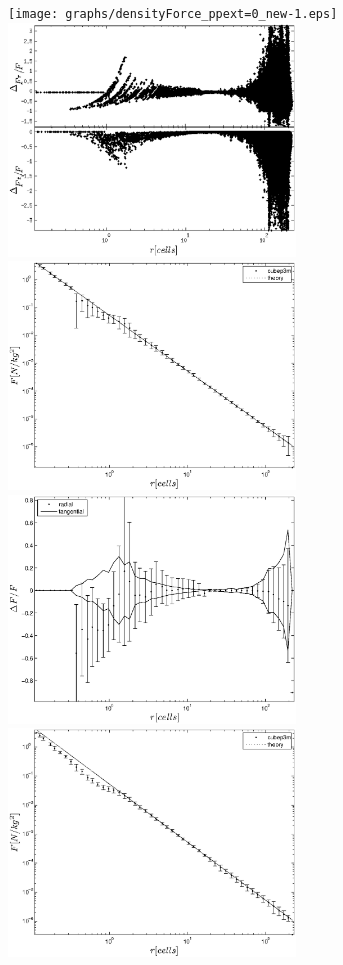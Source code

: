 \documentclass[useAMS,usenatbib]{mn2e}
\begin{document}
\begin{figure}%
  \begin{center}
    \texttt{[image: graphs/densityForce\_ppext=0\_new-1.eps]}
    \includegraphics[width=3.0in]{graphs/densityForce_fracErr_ppext=0_new.eps}
    \includegraphics[width=3.0in]{graphs/densityForce_ppext=0_rebin_new-1.eps}
    \includegraphics[width=3.0in]{graphs/DeltaF_pp0.eps}
    \includegraphics[width=3.0in]{graphs/densityForce_ppext=0_rebin_N10_new-1.eps}

\end{center}
\end{figure}
\end{document}
